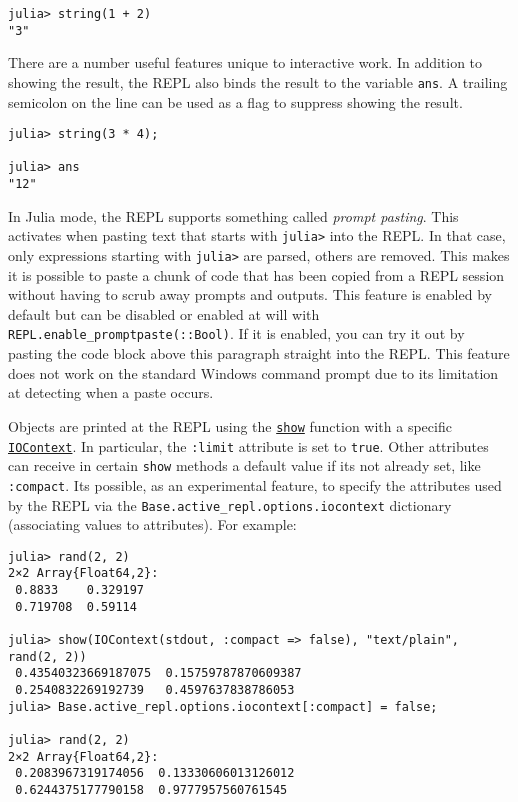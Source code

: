 \begin{verbatim}
julia> string(1 + 2)
"3"
\end{verbatim}



There are a number useful features unique to interactive work. In addition to showing the result, the REPL also binds the result to the variable \texttt{ans}. A trailing semicolon on the line can be used as a flag to suppress showing the result.




\begin{verbatim}
julia> string(3 * 4);

julia> ans
"12"
\end{verbatim}



In Julia mode, the REPL supports something called \emph{prompt pasting}. This activates when pasting text that starts with \texttt{julia>} into the REPL. In that case, only expressions starting with \texttt{julia>} are parsed, others are removed. This makes it is possible to paste a chunk of code that has been copied from a REPL session without having to scrub away prompts and outputs. This feature is enabled by default but can be disabled or enabled at will with \texttt{REPL.enable\_promptpaste(::Bool)}. If it is enabled, you can try it out by pasting the code block above this paragraph straight into the REPL. This feature does not work on the standard Windows command prompt due to its limitation at detecting when a paste occurs.



Objects are printed at the REPL using the \hyperlink{3223750698971992746}{\texttt{show}} function with a specific \hyperlink{13454403377667762339}{\texttt{IOContext}}. In particular, the \texttt{:limit} attribute is set to \texttt{true}. Other attributes can receive in certain \texttt{show} methods a default value if it{\textquotesingle}s not already set, like \texttt{:compact}. It{\textquotesingle}s possible, as an experimental feature, to specify the attributes used by the REPL via the \texttt{Base.active\_repl.options.iocontext} dictionary (associating values to attributes). For example:




\begin{verbatim}
julia> rand(2, 2)
2×2 Array{Float64,2}:
 0.8833    0.329197
 0.719708  0.59114

julia> show(IOContext(stdout, :compact => false), "text/plain", rand(2, 2))
 0.43540323669187075  0.15759787870609387
 0.2540832269192739   0.4597637838786053
julia> Base.active_repl.options.iocontext[:compact] = false;

julia> rand(2, 2)
2×2 Array{Float64,2}:
 0.2083967319174056  0.13330606013126012
 0.6244375177790158  0.9777957560761545
\end{verbatim}



